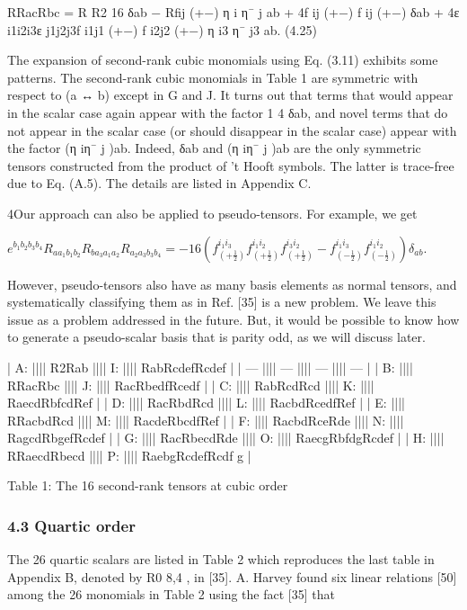 \documentclass{article}
\begin{document}
RRacRbc = R R2 16 δab − Rfij (+−) η i η¯ j ab + 4f ij (+−) f ij (+−) δab + 4ε i1i2i3ε j1j2j3f i1j1 (+−) f i2j2 (+−) η i3 η¯ j3 ab. (4.25)

The expansion of second-rank cubic monomials using Eq. (3.11) exhibits some patterns. The second-rank cubic monomials in Table 1 are symmetric with respect to (a ↔ b) except in G and J. It turns out that terms that would appear in the scalar case again appear with the factor 1 4 δab, and novel terms that do not appear in the scalar case (or should disappear in the scalar case) appear with the factor (η iη¯ j )ab. Indeed, δab and (η iη¯ j )ab are the only symmetric tensors constructed from the product of 't Hooft symbols. The latter is trace-free due to Eq. (A.5). The details are listed in Appendix C.

4Our approach can also be applied to pseudo-tensors. For example, we get

$e^{b_{1}b_{2}b_{3}b_{4}}R_{aa_{1}b_{1}b_{2}}R_{ba_{3}a_{1}a_{2}}R_{a_{2}a_{3}b_{3}b_{4}}=-16\left(f^{i_{1}i_{3}}_{(+\frac{1}{2})}f^{i_{1}i_{2}}_{(+\frac{1}{2})}f^{i_{3}i_{2}}_{(+\frac{1}{2})}-f^{i_{1}i_{3}}_{(-\frac{1}{2})}f^{i_{1}i_{2}}_{(-\frac{1}{2})}\right)\delta_{ab}$.

However, pseudo-tensors also have as many basis elements as normal tensors, and systematically classifying them as in Ref. [35] is a new problem. We leave this issue as a problem addressed in the future. But, it would be possible to know how to generate a pseudo-scalar basis that is parity odd, as we will discuss later.

| A:  |||| R2Rab       |||| I:  |||| RabRcdefRcdef    |
| --- |||| ---         |||| --- |||| ---              |
| B:  |||| RRacRbc     |||| J:  |||| RacRbedfRcedf    |
| C:  |||| RabRcdRcd   |||| K:  |||| RaecdRbfcdRef    |
| D:  |||| RacRbdRcd   |||| L:  |||| RacbdRcedfRef    |
| E:  |||| RRacbdRcd   |||| M:  |||| RacdeRbcdfRef    |
| F:  |||| RacbdRceRde |||| N:  |||| RagcdRbgefRcdef  |
| G:  |||| RacRbecdRde |||| O:  |||| RaecgRbfdgRcdef  |
| H:  |||| RRaecdRbecd |||| P:  |||| RaebgRcdefRcdf g |

Table 1: The 16 second-rank tensors at cubic order

\subsubsection{4.3 Quartic order}

The 26 quartic scalars are listed in Table 2 which reproduces the last table in Appendix B, denoted by R0 8,4 , in [35]. A. Harvey found six linear relations [50] among the 26 monomials in Table 2 using the fact [35] that
\end{document}
